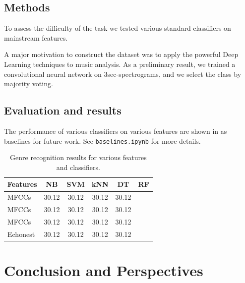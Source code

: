 \documentclass{article}
\begin{document}

\subsection{Methods}

To assess the difficulty of the task we tested various standard classifiers on mainstream features.

A major motivation to construct the dataset was to apply the powerful Deep Learning techniques to music analysis. As a preliminary result, we trained a convolutional neural network on 3sec-spectrograms, and we select the class by majority voting.

\subsection{Evaluation and results}

The performance of various classifiers on various features are shown in  as baselines for future work.
See \texttt{baselines.ipynb} for more details.


\begin{table}
	\centering
	\begin{tabular}{lccccc}
		\toprule
		Features & NB & SVM & kNN & DT & RF \\
		\midrule
		MFCCs  & 30.12 & 30.12 & 30.12 & 30.12 \\
		MFCCs  & 30.12 & 30.12 & 30.12 & 30.12 \\
		MFCCs  & 30.12 & 30.12 & 30.12 & 30.12 \\
		Echonest  & 30.12 & 30.12 & 30.12 & 30.12 \\
		\bottomrule
	\end{tabular}
	\caption{Genre recognition results for various features and classifiers.}
	\label{tab:mgr}
\end{table}


\section{Conclusion and Perspectives}
\end{document}
